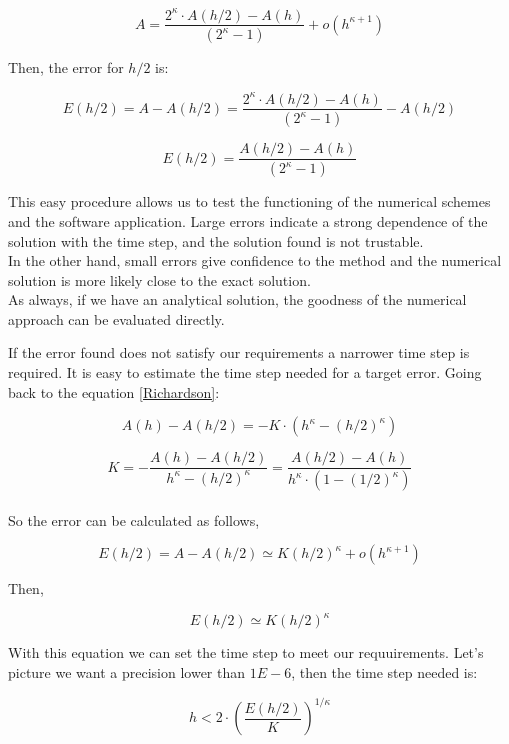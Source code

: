 \begin{equation}
A= \frac{2^{\kappa}\cdot A(h/2)- A(h)}{(2^{\kappa}-1) } +
o(h^{\kappa+1})
\end{equation}

Then, the error for $h/2$ is: 

\begin{equation}
E(h/2) = A-A(h/2) = \frac{2^{\kappa}\cdot A(h/2)- A(h)}{(2^{\kappa}-1) } -
A(h/2)
\end{equation}

\begin{equation}
E(h/2) =  \frac{ A(h/2)- A(h)}{(2^{\kappa}-1) } 
\end{equation}

This easy procedure allows us to test the functioning of the numerical schemes
and the software application. Large errors indicate a strong dependence of the
solution with the time step, and the solution found is not trustable.\\

In the other hand, small errors give confidence to the method and the numerical
solution is more likely close to the exact solution.\\

As always, if we have an analytical solution, the goodness of the numerical
approach can be evaluated directly. \\

\newpage

If the error found does not satisfy our requirements a narrower time step
is required. It is easy to estimate the time step needed for a target error.
Going back to the equation \ref{Richardson}: 

\begin{equation}
A(h)-A(h/2)=-K\cdot (h^\kappa - (h/2)^\kappa)
\end{equation} 

\begin{equation}
K =-\frac{A(h)-A(h/2)}{ h^\kappa-(h/2)^\kappa }= \frac{A(h/2)-A(h)}{
h^\kappa \cdot(1-(1/2)^\kappa )}
\end{equation} \\

So the error can be calculated as follows,

\begin{equation}
E(h/2) = A-A(h/2) \simeq K(h/2)^\kappa+o(h^{\kappa+1})
\end{equation}

Then, 

\begin{equation}
E(h/2)  \simeq K(h/2)^\kappa
\end{equation}

With this equation we can set the time step to meet our requuirements. Let's
picture we want a precision lower than $1E-6$, then the time step needed is: 

\begin{equation}
h< 2 \cdot \left ( \frac{E(h/2)}{K}\right)^{1/\kappa}  
\end{equation}





